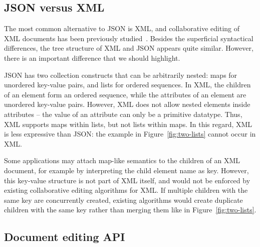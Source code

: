 \documentclass[10pt,journal,compsoc]{IEEEtran}
\begin{document}
\subsection{JSON versus XML}\label{sec:json-xml}

The most common alternative to JSON is XML, and collaborative editing of XML documents has been previously studied~\cite{Davis:2002iv,Ignat:2003jy,Wang:2015vo}. Besides the superficial syntactical differences, the tree structure of XML and JSON appears quite similar. However, there is an important difference that we should highlight.

JSON has two collection constructs that can be arbitrarily nested: maps for unordered key-value pairs, and lists for ordered sequences. In XML, the children of an element form an ordered sequence, while the attributes of an element are unordered key-value pairs. However, XML does not allow nested elements inside attributes -- the value of an attribute can only be a primitive datatype. Thus, XML supports maps within lists, but not lists within maps. In this regard, XML is less expressive than JSON: the example in Figure~\ref{fig:two-lists} cannot occur in XML.

Some applications may attach map-like semantics to the children of an XML document, for example by interpreting the child element name as key. However, this key-value structure is not part of XML itself, and would not be enforced by existing collaborative editing algorithms for XML. If multiple children with the same key are concurrently created, existing algorithms would create duplicate children with the same key rather than merging them like in Figure~\ref{fig:two-lists}.

\subsection{Document editing API}\label{sec:editing-api}
\end{document}
